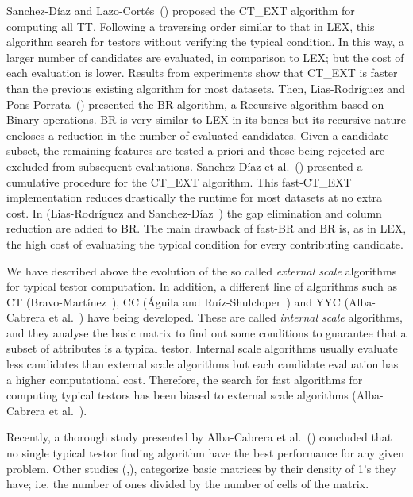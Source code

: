 \documentclass[citeauthoryear]{llncs}
\begin{document}
	Sanchez-D\'iaz and Lazo-Cort\'es~(\cite{Sanchez2007}) proposed the CT\_EXT algorithm for computing all TT. Following a traversing order similar to that in LEX, this algorithm search for testors without verifying the typical condition. In this way, a larger number of candidates are evaluated, in comparison to LEX; but the cost of each evaluation is lower. Results from experiments	show that CT\_EXT is faster than the previous existing algorithm for most datasets. Then, Lias-Rodr\'iguez and Pons-Porrata~(\cite{Lias2009}) presented the BR algorithm, a Recursive algorithm based on Binary operations. BR is very similar to LEX in its bones but its recursive nature encloses a reduction in the number of evaluated candidates. Given a candidate subset, the remaining features are tested a priori and those being rejected are excluded from subsequent evaluations. Sanchez-D\'iaz et al.~(\cite{Sanchez2010}) presented a cumulative procedure for the CT\_EXT algorithm. This fast-CT\_EXT implementation reduces drastically the runtime for most datasets at no extra cost. In (Lias-Rodr\'iguez and Sanchez-D\'iaz~\cite{Lias2013}) the gap elimination and column reduction are added to BR. The main drawback of fast-BR and BR is, as in LEX, the high cost of evaluating the typical condition for every contributing candidate. 
	
	We have described above the evolution of the so called \emph{external scale} algorithms for typical testor computation. In addition, a different line of algorithms such as CT (Bravo-Martínez~\cite{Bravo83}), CC (Águila and Ruíz-Shulcloper~\cite{Aguila84}) and YYC (Alba-Cabrera et al.~\cite{Alba14}) have being developed. These are called \emph{internal scale} algorithms, and they analyse the basic matrix to find out some conditions to guarantee that a subset of attributes is a typical testor. Internal scale algorithms usually evaluate less candidates than external scale algorithms but each candidate evaluation has a higher computational cost. Therefore, the search for fast algorithms for computing typical testors has been biased to external scale algorithms (Alba-Cabrera et al.~\cite{Alba14}).
	
	Recently, a thorough study presented by Alba-Cabrera et al.~(\cite{Alba13}) concluded that no single typical testor finding algorithm have the best performance for any given problem. Other studies (\cite{Lias2013},\cite{Rodriguez15}), categorize basic matrices by their density of 1's they have; i.e. the number of ones divided by the number of cells of the matrix. 
%
\end{document}

